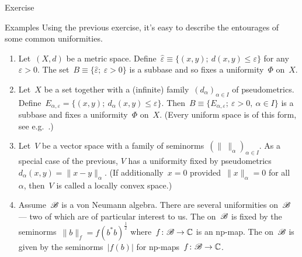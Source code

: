 \documentclass[b]{subfiles}
\begin{document}
\begin{parsec}
\begin{point}{Exercise}
\end{point}
\begin{point}{Examples}%
Using the previous exercise, it's easy
to describe the entourages of some common uniformities.
    \begin{enumerate}
        \item
    Let~$(X,d)$ be a metric space.
Define~$\hat\varepsilon \equiv \{(x,y);\ d(x,y) \leq \varepsilon\}$
for any $\varepsilon > 0$.
The set~$B \equiv \{ \hat\varepsilon; \ \varepsilon > 0\}$
is a subbase and so fixes a uniformity~$\Phi$ on~$X$.
        \item
    Let~$X$ be a set together with a (infinite)
            family~$(d_{\alpha})_{\alpha\in I}$
        of pseudometrics.
    Define~$E_{\alpha,\varepsilon} = \{ (x,y); \ d_\alpha(x,y)
            \leq \varepsilon\}$.
            Then~$B \equiv \{ E_{\alpha,\varepsilon}; \ \varepsilon > 0, \ 
                    \alpha \in I\}$
                    is a subbase and fixes
                    a uniformity~$\Phi$ on~$X$.
(Every uniform space is of this form, see e.g.~\cite[Thm.~39.11]{willard}.)
\item
Let~$V$ be a vector space with a
family of seminorms~$(\|\  \|_\alpha)_{\alpha \in I}$.
As a special case of the previous,
 $V$ has a uniformity fixed by
    pseudometrics~$d_\alpha(x,y) = \|x-y\|_\alpha$.
    (If additionally~$x =0$ provided~$\|x\|_\alpha = 0$ for all~$\alpha$,
    then~$V$ is called a locally convex space.)

\item
Assume~$\mathscr{B}$ is a von Neumann algebra.
There are several uniformities on~$\mathscr{B}$ --- two of which
    are of particular interest to us.
    The  on~$\mathscr{B}$
is fixed by the seminorms~$\|b\|_f = f(b^*b)^{\frac{1}{2}}$
        where~$f\colon \mathscr{B} \to \mathbb{C}$ is an np-map.
        The  on~$\mathscr{B}$
    is given by the seminorms~$|f(b)|$
        for np-maps~$f\colon \mathscr{B} \to \mathbb{C}$.


\end{enumerate}
\end{point}
\end{parsec}
\end{document}
